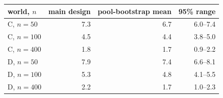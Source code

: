 \begin{tabular}{lrrr}\toprule
world, $n$ & main design & pool-bootstrap mean & 95\% range \\\midrule
C, $n{=}50$ & 7.3 & 6.7 & 6.0--7.4 \\
C, $n{=}100$ & 4.5 & 4.4 & 3.8--5.0 \\
C, $n{=}400$ & 1.8 & 1.7 & 0.9--2.2 \\
D, $n{=}50$ & 7.9 & 7.4 & 6.6--8.1 \\
D, $n{=}100$ & 5.3 & 4.8 & 4.1--5.5 \\
D, $n{=}400$ & 2.2 & 1.7 & 1.0--2.3 \\
\bottomrule
\end{tabular}
